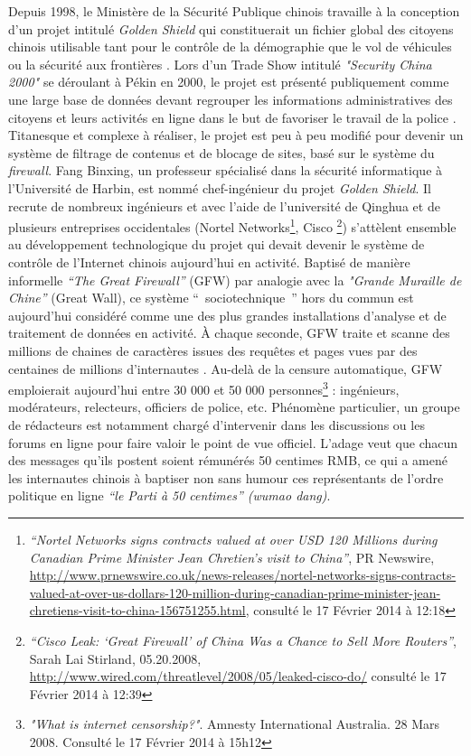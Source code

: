 Depuis 1998, le Ministère de la Sécurité Publique chinois travaille à la conception d’un projet intitulé \textit{Golden Shield} qui constituerait un fichier global des citoyens chinois utilisable tant pour le contrôle de la démographie que le vol de véhicules ou la sécurité aux frontières \citep{Lyons2009}. Lors d’un Trade Show intitulé \textit{"Security China 2000"} se déroulant à Pékin en 2000, le projet est présenté publiquement comme une large base de données devant regrouper les informations administratives des citoyens et leurs activités en ligne dans le but de favoriser le travail de la police \citep{Walton2001}. Titanesque et complexe à réaliser, le projet est peu à peu modifié pour devenir un système de filtrage de contenus et de blocage de sites, basé sur le système du \textit{firewall}. Fang Binxing, un professeur spécialisé dans la sécurité informatique à l’Université de Harbin, est nommé chef-ingénieur du projet \textit{Golden Shield}. Il recrute de nombreux ingénieurs et avec l’aide de l’université de Qinghua et de plusieurs entreprises occidentales (Nortel Networks\footnote{\textit{“Nortel Networks signs contracts valued at over USD 120 Millions during Canadian Prime Minister Jean Chretien’s visit to China”}, PR Newswire, \url{http://www.prnewswire.co.uk/news-releases/nortel-networks-signs-contracts-valued-at-over-us-dollars-120-million-during-canadian-prime-minister-jean-chretiens-visit-to-china-156751255.html}, consulté le 17 Février 2014 à 12:18}, Cisco \footnote{\textit{“Cisco Leak: ‘Great Firewall’ of China Was a Chance to Sell More Routers”}, 
Sarah Lai Stirland, 05.20.2008, \url{http://www.wired.com/threatlevel/2008/05/leaked-cisco-do/} consulté le 17 Février 2014 à 12:39}) s’attèlent ensemble au développement technologique du projet qui devait devenir le système de contrôle de l’Internet chinois aujourd’hui en activité. Baptisé de manière informelle \textit{“The Great Firewall”} (GFW) par analogie avec la \textit{"Grande Muraille de Chine”} (Great Wall), ce système `` sociotechnique '' hors du commun est aujourd’hui considéré comme une des plus grandes installations d’analyse et de traitement de données en activité. À chaque seconde, GFW traite et scanne des millions de chaines de caractères issues des requêtes et pages vues par des centaines de millions d’internautes \citep{Winter2012}. Au-delà de la censure automatique, GFW emploierait aujourd’hui entre 30 000 et 50 000 personnes\footnote{\textit{"What is internet censorship?"}. Amnesty International Australia. 28 Mars 2008. Consulté le 17 Février 2014 à 15h12} : ingénieurs, modérateurs, relecteurs, officiers de police, etc. Phénomène particulier, un groupe de rédacteurs est notamment chargé d’intervenir dans les discussions ou les forums en ligne pour faire valoir le point de vue officiel. L’adage veut que chacun des messages qu’ils postent soient rémunérés 50 centimes RMB, ce qui a amené les internautes chinois à baptiser non sans humour ces représentants de l’ordre politique en ligne \textit{“le Parti à 50 centimes” (wumao dang)}.

